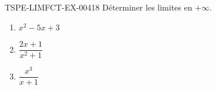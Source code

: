 \begin{exercice}{TSPE-LIMFCT-EX-004}{1}{8}
Déterminer les limites en $+\infty$.
\begin{enumerate}
  \item $x^2 - 5x + 3$
  \item $\dfrac{2x + 1}{x^2 + 1}$
  \item $\dfrac{x^3}{x + 1}$
\end{enumerate}
\end{exercice}
